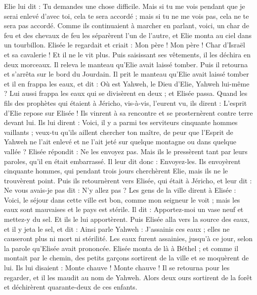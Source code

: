 \begin{multicols}{2}
Elie lui dit : Tu demandes une chose difficile. Mais si tu me vois pendant que je serai enlevé d'avec toi, cela te sera accordé ; mais si tu ne me vois pas, cela ne te sera pas accordé.
Comme ils continuaient à marcher en parlant, voici, un char de feu et des chevaux de feu les séparèrent l'un de l'autre, et Elie monta au ciel dans un tourbillon.
Elisée le regardait et criait : Mon père ! Mon père ! Char d'Israël et sa cavalerie ! Et il ne le vit plus. Puis saisissant ses vêtements, il les déchira en deux morceaux.
Il releva le manteau qu'Elie avait laissé tomber. Puis il retourna et s'arrêta sur le bord du Jourdain.
Il prit le manteau qu'Elie avait laissé tomber et il en frappa les eaux, et dit : Où est Yahweh, le Dieu d'Elie, Yahweh lui-même ? Lui aussi frappa les eaux qui se divisèrent en deux ; et Elisée passa.
Quand les fils des prophètes qui étaient à Jéricho, vis-à-vis, l'eurent vu, ils dirent : L'esprit d'Elie repose sur Elisée ! Ils vinrent à sa rencontre et se prosternèrent contre terre devant lui.
Ils lui dirent : Voici, il y a parmi tes serviteurs cinquante hommes vaillants ; veux-tu qu'ils aillent chercher ton maître, de peur que l'Esprit de Yahweh ne l'ait enlevé et ne l'ait jeté sur quelque montagne ou dans quelque vallée ? Elisée répondit : Ne les envoyez pas.
Mais ils le pressèrent tant par leurs paroles, qu'il en était embarrassé. Il leur dit donc : Envoyez-les. Ils envoyèrent cinquante hommes, qui pendant trois jours cherchèrent Elie, mais ils ne le trouvèrent point.
Puis ils retournèrent vers Elisée, qui était à Jéricho, et leur dit : Ne vous avais-je pas dit : N'y allez pas ?
Les gens de la ville dirent à Elisée : Voici, le séjour dans cette ville est bon, comme mon seigneur le voit ; mais les eaux sont mauvaises et le pays est stérile.
Il dit : Apportez-moi un vase neuf et mettez-y du sel. Et ils le lui apportèrent.
Puis Elisée alla vers la source des eaux, et il y jeta le sel, et dit : Ainsi parle Yahweh : J'assainis ces eaux ; elles ne causeront plus ni mort ni stérilité.
Les eaux furent assainies, jusqu'à ce jour, selon la parole qu'Elisée avait prononcée.
Elisée monta de là à Béthel ; et comme il montait par le chemin, des petits garçons sortirent de la ville et se moquèrent de lui. Ils lui disaient : Monte chauve ! Monte chauve !
Il se retourna pour les regarder, et il les maudit au nom de Yahweh. Alors deux ours sortirent de la forêt et déchirèrent quarante-deux de ces enfants.

\end{multicols}
